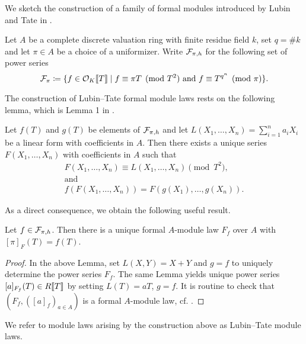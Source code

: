 We sketch the construction of a family of formal modules introduced by 
Lubin and Tate in \cite{LubinTateFormalMult}.

Let $A$ be a complete discrete valuation ring with 
finite residue field $k$, set $q = \# k$ and let $\pi \in A$ be a choice of a
uniformizer.
Write $\mathcal{F}_{\pi, h}$ for the following set of power series
\begin{equation*}
  \mathcal{F}_\pi \coloneqq \{f \in \mathcal{O}_K \llbracket T \rrbracket \mid f \equiv \pi T \pmod {T^2}
  \text{ and } f \equiv T^{q^n} \pmod \pi\}. 
\end{equation*}

The construction of Lubin--Tate formal module laws rests on the following 
lemma, which is Lemma 1 in \cite{LubinTateFormalMult}.
\begin{lem}\label{lem:LTLemma1}
  Let $f(T)$ and $g(T)$ be elements of $\mathcal{F}_{\pi,h}$ and let 
  $L(X_1, \dots, X_n) = \sum_{i=1}^n a_i X_i$ be a linear form with coefficients in 
  $A$. Then there exists a unique series $F(X_1, \dots, X_n)$ with coefficients 
  in $A$ such that 
  \begin{gather*}
    F(X_1, \dots, X_n) \equiv L(X_1, \dots, X_n) \pmod {T^2}, \\ \text{and} \\
    f(F(X_1, \dots, X_n)) = F(g(X_1), \dots, g(X_n)).
  \end{gather*}
\end{lem}

As a direct consequence, we obtain the following useful result.
\begin{lem}
  Let $f \in \mathcal{F}_{\pi, h}$. Then there is a unique formal $A$-module law $F_f$ over $A$
  with $[\pi]_F(T) = f(T)$.
\begin{proof}
  In the above Lemma, set $L(X,Y) = X+Y$ and $g=f$ to uniquely determine 
  the power series $F_f$. The same Lemma yields unique power series
  $[a]_{F_f}(T) \in R\llbracket T \rrbracket$ by setting $L(T) = a T$, $g=f$. It is
  routine to check that $(F_f, ([a]_f)_{a \in A})$ is a formal $A$-module law, 
  cf. \cite{LubinTateFormalMult}.
\end{proof}
\end{lem}

\begin{defi}
  We refer to module laws arising by the construction above as Lubin--Tate module laws.
\end{defi}

